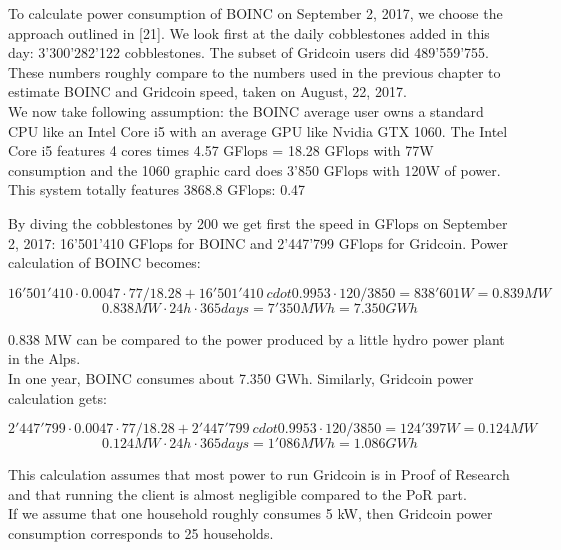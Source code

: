 To calculate power consumption of BOINC on September 2, 2017, we choose the approach outlined in [21]. We look first at the daily cobblestones added in this day: 3'300'282'122 cobblestones. The subset of Gridcoin users did 489'559'755. These numbers roughly compare to the numbers used in the previous chapter to estimate BOINC and Gridcoin speed, taken on August, 22, 2017.\\ 

We now take following assumption: the BOINC average user owns a standard CPU like an Intel Core i5 with an average GPU like Nvidia GTX 1060. The Intel Core i5 features 4 cores times 4.57 GFlops = 18.28 GFlops with 77W consumption and the 1060 graphic card does 3'850 GFlops with 120W of power. This system totally features 3868.8 GFlops: 0.47%

By diving the cobblestones by 200 we get first the speed in GFlops on September 2, 2017: 16'501'410 GFlops for BOINC and 2'447'799 GFlops for Gridcoin. Power calculation of BOINC becomes:

\[ 16'501'410 \cdot 0.0047 \cdot 77/18.28 + 16'501'410 \ cdot 0.9953 \cdot 120/3850 = 838'601 W = 0.839 MW \]
\[ 0.838 MW \cdot 24 h \cdot 365 days = 7'350 MWh = 7.350 GWh \]

0.838 MW can be compared to the power produced by a little hydro power plant in the Alps. \\
In one year, BOINC consumes about 7.350 GWh. Similarly, Gridcoin power calculation gets:

\[ 2'447'799 \cdot 0.0047 \cdot 77/18.28 + 2'447'799 \ cdot 0.9953 \cdot 120/3850 = 124'397 W = 0.124 MW \]
\[ 0.124 MW \cdot 24 h \cdot 365 days = 1'086 MWh = 1.086 GWh \]

This calculation assumes that most power to run Gridcoin is in Proof of Research and that running the client is almost negligible compared to the PoR part.\\
If we assume that one household roughly consumes 5 kW, then Gridcoin power consumption corresponds to 25 households.\\


